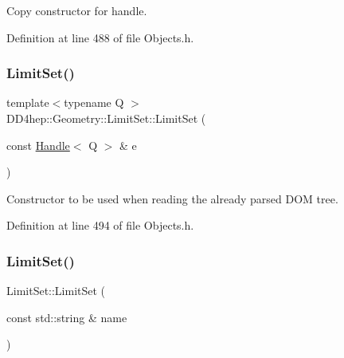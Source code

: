 Copy constructor for handle. 



Definition at line 488 of file Objects.\+h.

\hypertarget{class_d_d4hep_1_1_geometry_1_1_limit_set_a7832b9a0095954013a895d8987b01717}{}\label{class_d_d4hep_1_1_geometry_1_1_limit_set_a7832b9a0095954013a895d8987b01717} 
\subsubsection{\texorpdfstring{Limit\+Set()}{LimitSet()}\hspace{0.1cm}{\footnotesize\ttfamily [4/5]}}
{\footnotesize\ttfamily template$<$typename Q $>$ \\
D\+D4hep\+::\+Geometry\+::\+Limit\+Set\+::\+Limit\+Set (\begin{DoxyParamCaption}\item[{const \hyperlink{class_d_d4hep_1_1_handle}{Handle}$<$ Q $>$ \&}]{e }\end{DoxyParamCaption})\hspace{0.3cm}{\ttfamily [inline]}}



Constructor to be used when reading the already parsed D\+OM tree. 



Definition at line 494 of file Objects.\+h.

\hypertarget{class_d_d4hep_1_1_geometry_1_1_limit_set_a97abd909eb2de79b0542bab693c3c836}{}\label{class_d_d4hep_1_1_geometry_1_1_limit_set_a97abd909eb2de79b0542bab693c3c836} 
\subsubsection{\texorpdfstring{Limit\+Set()}{LimitSet()}\hspace{0.1cm}{\footnotesize\ttfamily [5/5]}}
{\footnotesize\ttfamily Limit\+Set\+::\+Limit\+Set (\begin{DoxyParamCaption}\item[{const std\+::string \&}]{name }\end{DoxyParamCaption})}



